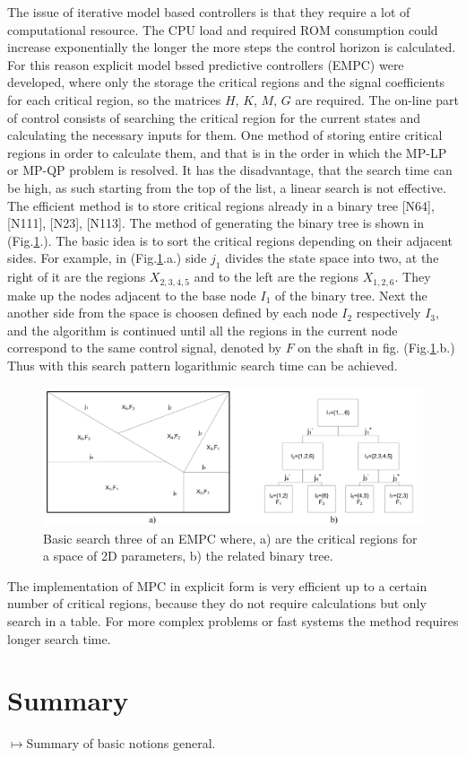 The issue of iterative model based controllers is that they require a lot of computational resource. The CPU load and required ROM consumption could increase exponentially the longer the more steps the control horizon is calculated. For this reason explicit model bssed predictive controllers (EMPC) were developed, where only the storage the critical regions and the signal coefficients for each critical region, so the matrices $H$, $K$, $M$, $G$ are required. The on-line part of control consists of searching the critical region for the current states and calculating the necessary inputs for them.
One method of storing entire critical regions in order to calculate them, and that is in the order in which the MP-LP or MP-QP problem is resolved. It has the disadvantage, that the search time can be high, as such starting from the top of the list, a linear search is not effective. The efficient method is to store critical regions already in a binary tree [N64], [N111], [N23], [N113]. The method of generating the binary tree is shown in (Fig.\ref{BASICMPC:fig:searchtree}.). The basic idea is to sort the critical regions
depending on their adjacent sides. For example, in (Fig.\ref{BASICMPC:fig:searchtree}.a.) side $j_1$ divides the state space into two, at the right of it are the regions $X_{2,3,4,5}$ and to the left are the regions $X_{1,2,6}$. They make up the nodes adjacent to the base node $I_1$ of the binary tree. Next the another side from the space is choosen defined by each node $I_2$ respectively $I_3$, and the algorithm is continued until all the regions in the current node correspond to the same control signal, denoted by $F$ on the shaft in fig. (Fig.\ref{BASICMPC:fig:searchtree}.b.) Thus with this search pattern logarithmic search time can be achieved.

 \begin{figure}[!ht]
        \centering
        \includegraphics[width=\textwidth]{EMPC_PNG_Pics/BasicSearchTree.png}
        \caption{Basic search three of an EMPC where, a) are the critical regions for a space of 2D parameters,
b) the related binary tree.}
        \label{BASICMPC:fig:searchtree}
    \end{figure}

The implementation of MPC in explicit form is very efficient up to a certain number of critical regions, because they do not require calculations but only search in a table. For more complex problems or fast systems the method requires longer search time.

\section{Summary}

$\longmapsto$Summary of basic notions general.

